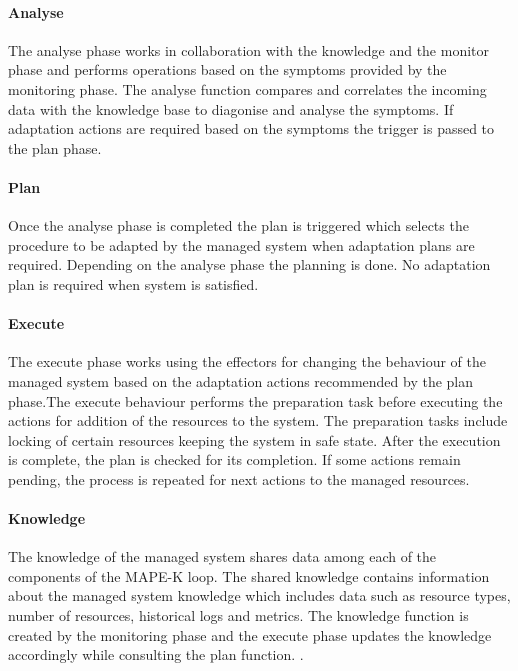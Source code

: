 \paragraph*{Analyse}

The analyse phase works in collaboration with the knowledge and the monitor phase and performs operations based on the symptoms provided by the monitoring phase.  
The analyse function compares and correlates the incoming data with the knowledge base to diagonise and analyse the symptoms. If adaptation actions are required based on the symptoms the trigger is passed to the plan phase. 
 

\paragraph*{Plan}

Once the analyse phase is completed the plan is triggered which selects the procedure
to be adapted by the managed system when adaptation plans are required. Depending on the analyse phase the planning is done. No adaptation plan is required when system is satisfied. 


\paragraph*{Execute}

The execute phase works using the effectors for changing the behaviour of the managed
system based on the adaptation actions recommended by the plan phase.The execute behaviour performs the preparation task before executing the actions for addition of the resources to the system. The preparation tasks include locking of certain resources keeping the system in safe state. After the
execution is complete, the plan is checked for its completion. If some actions remain pending, the process is repeated for next actions to the managed resources.

\paragraph*{Knowledge}

The knowledge of the managed system shares data among each of the components of
the MAPE-K loop. The shared knowledge contains information about the managed system
knowledge which includes data such as resource types, number of resources, historical
logs and metrics. The knowledge function is created by the monitoring phase and the
execute phase updates the knowledge accordingly while consulting the plan function. 
\cite{kephart2003vision}.\\


